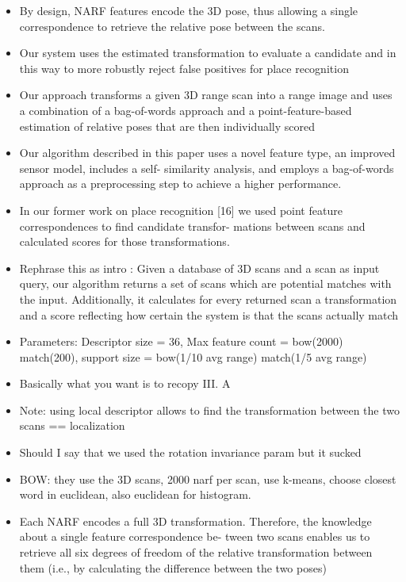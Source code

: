 \begin{itemize}
    \item By design, NARF features encode the 3D pose, thus allowing a single correspondence to retrieve the relative pose between the scans.
    \item Our system uses the estimated transformation to evaluate a candidate and in this way to more robustly reject false positives for place recognition
    \item Our approach transforms a given 3D range scan into a range image and uses a combination of a bag-of-words approach and a point-feature-based estimation of relative poses that are then individually scored
    \item Our algorithm described in this paper uses a novel feature type, an improved sensor model, includes a self- similarity analysis, and employs a bag-of-words approach as a preprocessing step to achieve a higher performance.
    \item In our former work on place recognition [16] we used point feature correspondences to find candidate transfor- mations between scans and calculated scores for those transformations.
    \item Rephrase this as intro : Given a database of 3D scans and a scan as input query, our algorithm returns a set of scans which are potential matches with the input. Additionally, it calculates for every returned scan a transformation and a score reflecting how certain the system is that the scans actually match
    \item Parameters: Descriptor size = 36, Max feature count = bow(2000) match(200), support size = bow(1/10 avg range) match(1/5 avg range)
    \item Basically what you want is to recopy III. A
    \item Note: using local descriptor allows to find the transformation between the two scans == localization
    \item Should I say that we used the rotation invariance param but it sucked
    \item BOW: they use the 3D scans, 2000 narf per scan, use k-means, choose closest word in euclidean, also euclidean for histogram.
    \item Each NARF encodes a full 3D transformation. Therefore, the knowledge about a single feature correspondence be- tween two scans enables us to retrieve all six degrees of freedom of the relative transformation between them (i.e., by calculating the difference between the two poses)

\end{itemize}
